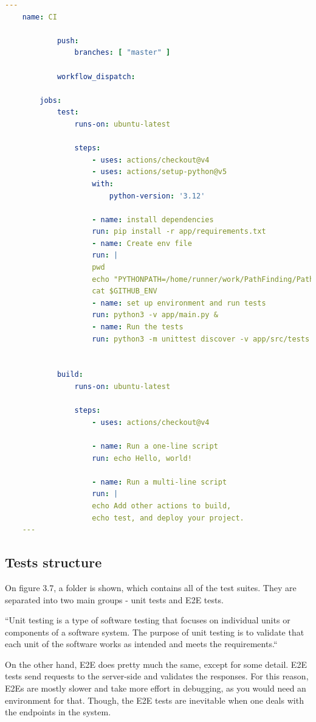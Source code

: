 \begin{lstlisting}[language=yaml]
	---
	name: CI
	
			push:
				branches: [ "master" ]
		
			workflow_dispatch:
		
		jobs:
			test:
				runs-on: ubuntu-latest
		
				steps:
					- uses: actions/checkout@v4
					- uses: actions/setup-python@v5
					with:
						python-version: '3.12' 
		
					- name: install dependencies
					run: pip install -r app/requirements.txt
					- name: Create env file
					run: |
					pwd
					echo "PYTHONPATH=/home/runner/work/PathFinding/PathFinding" >> $GITHUB_ENV
					cat $GITHUB_ENV
					- name: set up environment and run tests
					run: python3 -v app/main.py &
					- name: Run the tests
					run: python3 -m unittest discover -v app/src/tests
		

			build:
				runs-on: ubuntu-latest
		
				steps:
					- uses: actions/checkout@v4
		
					- name: Run a one-line script
					run: echo Hello, world!
		
					- name: Run a multi-line script
					run: |
					echo Add other actions to build,
					echo test, and deploy your project.
	---
\end{lstlisting}

\subsection{Tests structure}

On figure 3.7, a folder is shown, which contains all of the test suites. They are separated into two main groups - unit tests and E2E tests. 

``Unit testing is a type of software testing that focuses on individual units or components of a software system. The purpose of unit testing is to validate that each unit of the software works as intended and meets the requirements.``~\cite{gfg-unit-test-def} 

On the other hand, E2E does pretty much the same, except for some detail. E2E tests send requests to the server-side and validates the responses. For this reason, E2Es are mostly slower and take more effort in debugging, as you would need an environment for that. Though, the E2E tests are inevitable when one deals with the endpoints in the system.

